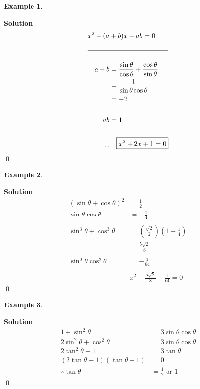\documentclass{article}
\newtheorem*{example*}{Example}
\newenvironment{solution}{\begin{trivlist}\item[]{\bf Solution}}{\qed \end{trivlist}}
\begin{document}
\newpage
\begin{example*}
\end{example*}
\begin{solution}
    \begin{align*}
        x^2 - (a &+ b)x + ab = 0
        \\\\
        \hline
        \\
        a + b
        &= \frac{\sin\theta}{\cos\theta} + \frac{\cos\theta}{\sin\theta} \\
        &= \frac{1}{\sin\theta\cos\theta} \\
        &= -2
        \\\\
        ab &= 1
        \\\\
        \therefore &\quad \boxed{x^2 + 2x + 1 = 0}
    \end{align*}
\end{solution}

\begin{example*}
\end{example*}
\begin{solution}
    \begin{align*}
        (\sin\theta + \cos\theta)^2 &= \frac{1}{2} \\
        \sin\theta\cos\theta &= -\frac{1}{4}
        \\\\
        \sin^3\theta + \cos^3\theta
        &= \left( \frac{\sqrt{2}}{2} \right)\left( 1 + \frac{1}{4} \right) \\
        &= \frac{5\sqrt{2}}{8}
        \\\\
        \sin^3\theta\cos^3\theta &= -\frac{1}{64}
        \\\\
        &\boxed{x^2 - \frac{5\sqrt{2}}{8} - \frac{1}{64} = 0}
    \end{align*}
\end{solution}

\newpage
\begin{example*}
\end{example*}
\begin{solution}
    \begin{align*}
        1 + \sin^2\theta &= 3\sin\theta\cos\theta \\
        2\sin^2\theta + \cos^2\theta &= 3\sin\theta\cos\theta \\
        2\tan^2\theta + 1 &= 3\tan\theta \\
        (2\tan\theta - 1)(\tan\theta - 1) &= 0 \\
        \therefore \tan\theta &= \boxed{\frac{1}{2} \text{ or } 1}
    \end{align*}
\end{solution}
\end{document}
